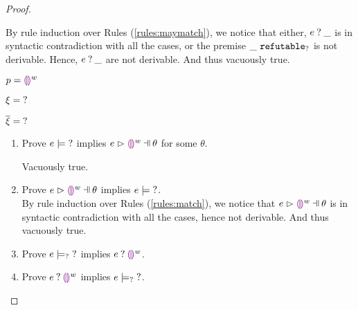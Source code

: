 \begin{proof}
\begin{byCases}
\begin{enumerate}
        By rule induction over Rules (\ref{rules:maymatch}), we notice that either, $e \mathbin{?} \_$ is in syntactic contradiction with all the cases, or the premise $\_ ~\mathtt{refutable}_?$ is not derivable. Hence, $e \mathbin{?} \_$ are not derivable. And thus vacuously true.
    \end{enumerate}
    
\item[\text{(\ref{rule:PTEHole})}]
    \begin{pfsteps*}
    \item $p=\textcolor{violet}{\llparenthesis}\textcolor{violet}{\rrparenthesis}^{w}$ 
    \item $\xi=\mathtt{?}$ 
    \item $\overline{\xi}=\mathtt{?}$ 
    \end{pfsteps*}
    \begin{enumerate}
    \item Prove $e \models \mathtt{?}$ implies $\hpatmatch{e}{\hehole{w}}{\theta}$ for some $\theta$.
        Vacuously true.
    \item Prove $\hpatmatch{e}{\hehole{w}}{\theta}$ implies $e \models \mathtt{?}$.\\
        By rule induction over Rules (\ref{rules:match}), we notice that $\hpatmatch{e}{\hehole{w}}{\theta}$ is in syntactic contradiction with all the cases, hence not derivable. And thus vacuously true.
    \item Prove $e \models_{?} \mathtt{?}$ implies $e \mathbin{?} \textcolor{violet}{\llparenthesis}\textcolor{violet}{\rrparenthesis}^{w}$.
    \item Prove $e \mathbin{?} \textcolor{violet}{\llparenthesis}\textcolor{violet}{\rrparenthesis}^{w}$ implies $e \models_{?} \mathtt{?}$.
    \end{enumerate}


\end{byCases}
\end{proof}
